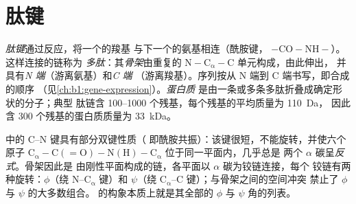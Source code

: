 \section{肽键}

\begin{definition}[肽键、多肽]\label{def:b1:proteins:peptide}
\emph{肽键}通过反应，将一个的羧基
与下一个的氨基相连（酰胺键，
$\mathrm{-CO{-}NH-}$）。这样连接的链称为
\emph{多肽}：其\emph{骨架}由重复的
$\mathrm{N{-}C_\alpha{-}C}$ 单元构成，由此伸出，
并具有\emph{N 端}（游离氨基）和\emph{C 端}
（游离羧基）。序列按从 N 端到 C 端书写，即合成的顺序
（见\cref{ch:b1:gene-expression}）。\emph{蛋白质}
是由一条或多条多肽折叠成确定形状的分子；典型
肽链含 \qtyrange{100}{1000}{} 个残基，每个残基的平均质量为 \qty{110}{Da}，
因此含 \qty{300}{} 个残基的蛋白质质量为 \qty{33}{kDa}。
\end{definition}

\begin{proposition}[肽键的几何构型]\label{prop:b1:proteins:geometry}
中的 C--N 键具有部分双键性质（
即酰胺共振）：该键很短，不能旋转，并使六个原子
$\mathrm{C_\alpha{-}C(=O){-}N(H){-}C_\alpha}$ 位于同一平面内，几乎总是
两个 $\alpha$ 碳呈\emph{反式}。骨架因此是
由刚性平面构成的链，各平面以 $\alpha$ 碳为铰链连接，每个
铰链有两种旋转：$\phi$（绕 N--$\mathrm{C_\alpha}$ 键）和
$\psi$（绕 $\mathrm{C_\alpha}$--C 键）；与骨架之间的空间冲突
禁止了 $\phi$ 与 $\psi$ 的大多数组合。
的构象本质上就是其全部的 $\phi$ 与
$\psi$ 角的列表。
\end{proposition}

